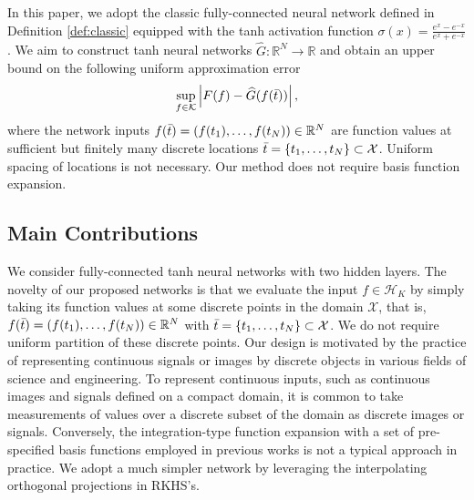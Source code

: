 \documentclass{article}
\def\RR{\mathbb R}
\numberwithin{equation}{section}
\begin{document}
In this paper, we adopt the classic fully-connected neural network defined in Definition \ref{def:classic} equipped with the tanh activation function $\sigma(x) = \frac{e^x- e^{-x}}{e^x+e^{-x}}$.
We aim to construct tanh neural networks $\widehat{G}: \RR^N \to \RR$ and obtain an upper bound on the following uniform approximation error
\begin{equation}\label{eq:uniapprox}
    \sup_{f\in \mathcal{K}}\left|F(f) - \widehat{G}(f(\Bar{t}))\right|,
\end{equation}
where the network inputs $f(\Bar{t}) = (f(t_1), \ldots, f(t_{N}))\in \RR^{N}$ are function values at sufficient but finitely many discrete locations $\Bar{t} = \{t_1, \ldots, t_N\}\subset \mathcal{X}$. 
Uniform spacing of locations is not necessary. 
Our method does not require basis function expansion. 



\subsection{Main Contributions}
We consider fully-connected tanh neural networks with two hidden layers. 
The novelty of our proposed networks is that we evaluate the input $f \in \mathcal{H}_K$ by simply taking its function values at some discrete points in the domain $\mathcal{X}$, that is, $f(\Bar{t}) = (f(t_1), \ldots, f(t_{N}))\in \RR^{N}$ with $\Bar{t}=\{t_1, \ldots, t_N\} \subset \mathcal{X}$.
We do not require uniform partition of these discrete points.
Our design is motivated by the practice of representing continuous signals or images by discrete objects in various fields of science and engineering. 
To represent continuous inputs, such as continuous images and signals defined on a compact domain, it is common to take measurements of values over a discrete subset of the domain as discrete images or signals. 
Conversely, the integration-type function expansion with a set of pre-specified basis functions employed in previous works is not a typical approach in practice.
We adopt a much simpler network by leveraging the interpolating orthogonal projections in RKHS's. 
\end{document}
